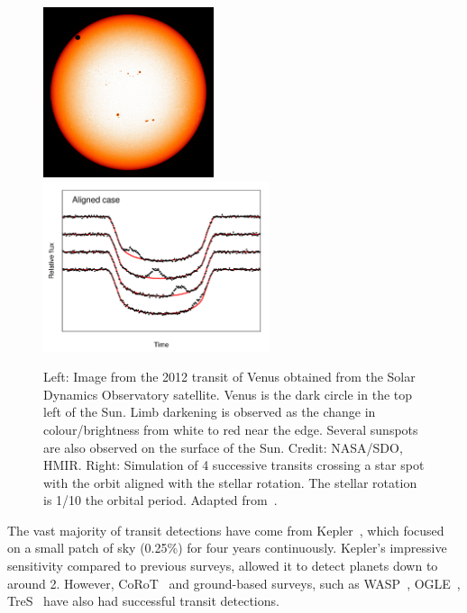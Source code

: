 \begin{figure}
    \centering
    \includegraphics[height=5cm]{./figures/introduction/SDO_2012_Venus_Transit.jpg}
    \includegraphics[height=5cm]{figures/introduction/sanchisojedafig1-crop.pdf}
    \caption[Transit of Venus and successive transit corssings.]{Left: Image from the 2012 transit of Venus obtained from the Solar Dynamics Observatory satellite.
    Venus is the dark circle in the top left of the Sun.
    Limb darkening is observed as the change in colour/brightness from white to red near the edge.
    Several sunspots are also observed on the surface of the Sun.
    Credit: {NASA}/{SDO}, {HMIR}.
    Right: Simulation of 4 successive transits crossing a star spot with the orbit aligned with the stellar rotation.
    The stellar rotation is 1/10 the orbital period.
    Adapted from~\citet[][Figure~1]{sanchis-ojeda_starspots_2013}.}
    \label{fig:transit_venus_transit_alignment}
\end{figure}


The vast majority of transit detections have come from Kepler~\citep{borucki_characteristics_2011}, which focused on a small patch of sky (0.25\%) for four years continuously.
Kepler's impressive sensitivity compared to previous surveys, allowed it to detect planets down to around 2\Rearth.
However, {CoRoT}~\citep{barge_transiting_2008} and ground-based surveys, such as WASP~\citep{pollacco_wasp_2006}, OGLE~\citep{udalski_optical_2002}, TreS~\citep{alonso_tres1_2004} have also had successful transit detections.

